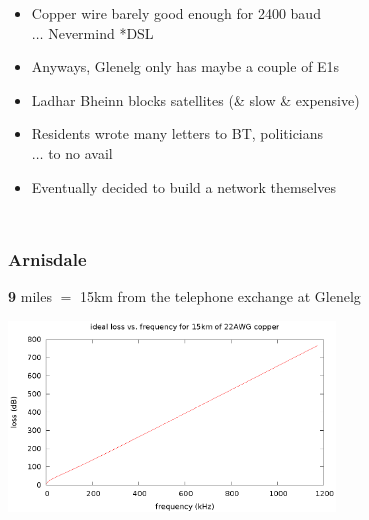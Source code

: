 \documentclass{beamer}
\begin{document}
\begin{frame}
\begin{columns}
\begin{itemize}
      \item Copper wire barely good enough for 2400 baud\\
        $\ldots$ Nevermind *DSL
      \item Anyways, Glenelg only has maybe a couple of E1s
      \item Ladhar Bheinn blocks satellites (\& slow \& expensive)
      \item Residents wrote many letters to BT, politicians\\
        $\ldots$ to no avail
      \item Eventually decided to build a network themselves
    \end{itemize}
  \end{columns}
\end{frame}
\begin{frame}
  \frametitle{Arnisdale}
  \begin{center}
    \textbf{9} miles $=$ 15km from the telephone exchange at Glenelg
    \par\includegraphics[width=0.65\textwidth]{loss}
    \par\vspace{\baselineskip}
    \scalebox{0.5}{
      \begin{tikzpicture}
        \xmissionline
      \end{tikzpicture}
    }
    \end{center}
\end{frame}
\end{document}
